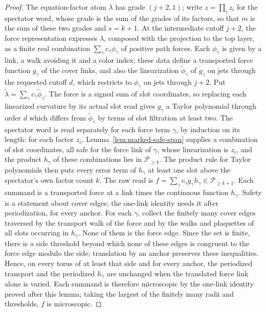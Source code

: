 \begin{proof}
The equation-factor atom $\lambda$ has grade $(j+2,1)$; write
$z=\prod_iz_i$ for the spectator word, whose grade is the sum of the
grades of its factors, so that $m$ is the sum of these two grades and
$s=k+1$.
At the intermediate cutoff $j+2$, the force representation expresses
$\lambda$, composed with the projection to the top layer, as a finite real
combination $\sum_\gamma c_\gamma\phi_\gamma$ of positive path
forces. Each $\phi_\gamma$ is given by a link, a walk avoiding it and a
color index; these data define a transported force function $g_\gamma$ of
the cover links, and also the linearization $\widetilde\phi_\gamma$ of
$g_\gamma$ on jets through the requested cutoff $d$, which restricts to
$\phi_\gamma$ on jets through $j+2$. Put
$\widetilde\lambda=\sum_\gamma c_\gamma\widetilde\phi_\gamma$. The
force is a signed sum of slot coordinates, so replacing each linearized
curvature by its actual slot read gives $g_\gamma$ a Taylor polynomial
through order $d$ which differs from $\widetilde\phi_\gamma$ by terms of
slot filtration at least two. The spectator word is read separately for
each force term $\gamma$, by induction on its length: for each factor
$z_i$, Lemma~\ref{lem:marked-safe-span} supplies a combination of slot
coordinates, all safe for the force link of $\gamma$, whose linearization
is $z_i$, and the product $h_\gamma$ of these combinations lies in
$\mathcal P_{\geq k}$. The product rule for Taylor polynomials then puts
every error term of $h_\gamma$ at least one slot above the spectator's
own factor count $k$. The raw read is
$f=\sum_\gamma c_\gamma g_\gamma h_\gamma\in\mathcal P_{\geq k+1}$.
Each summand is a transported force at a link times the continuous
function $h_\gamma$. Safety is a statement about cover edges; the
one-link identity needs it after periodization, for every anchor. For
each $\gamma$, collect the finitely many cover edges traversed by the
transport walk of the force and by the walks and plaquettes of all slots
occurring in $h_\gamma$. None of them is the force edge. Since the set is
finite, there is a side threshold beyond which none of these edges is
congruent to the force edge modulo the side; translation by an anchor
preserves these inequalities. Hence, on every torus of at least that
side and for every anchor, the periodized transport and the periodized
$h_\gamma$ are unchanged when the translated force link alone is varied.
Each summand is therefore microscopic by the
one-link identity proved after this lemma; taking the largest of the
finitely many radii and thresholds, $f$ is microscopic.


\end{proof}
